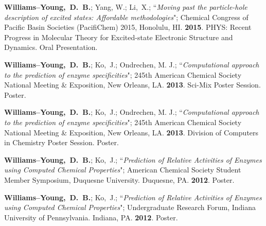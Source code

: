 \documentclass[10pt]{res} %
\newcommand*\me[0]{{\bf Williams--Young,~D.~B.}}
\newcommand*\xsli[0]{Li,~X.}
\newcommand*\ko[0]{Ko,~J.}
\begin{document}
\begin{resume}
\begin{etaremune}
  \item \me; Yang, W.; \xsli;
        ``\emph{Moving past the particle-hole description of excited states: Affordable methodologies}";
	Chemical Congress of Pacific Basin Societies (PacifiChem) 2015, Honolulu, HI.
	\textbf{2015}. 
	PHYS: Recent Progress in Molecular Theory for Excited-state Electronic Structure and
	Dynamics. Oral Presentation.
  \item \me; \ko; Ondrechen, M. J.;
	``\emph{Computational approach to the prediction of enzyme specificities}";
	245th American Chemical Society National Meeting \& Exposition, New Orleans, LA.
	\textbf{2013}. Sci-Mix Poster Session. Poster.
  \item \me; \ko; Ondrechen, M. J.;
	``\emph{Computational approach to the prediction of enzyme specificities}";
	245th American Chemical Society National Meeting \& Exposition, New Orleans, LA.
	\textbf{2013}. Division of Computers in Chemistry Poster Session. Poster.
  \item \me; \ko;
	``\emph{Prediction of Relative Activities of Enzymes using Computed Chemical Properties}";
	American Chemical Society Student Member Symposium, Duquesne University. Duquesne, PA.
	\textbf{2012}. Poster.
  \item \me; \ko;
	``\emph{Prediction of Relative Activities of Enzymes using Computed Chemical Properties}";
	Undergraduate Research Forum, Indiana University of Pennsylvania. Indiana, PA.
	\textbf{2012}. Poster.
\end{etaremune}

\vspace{0.2in} %


\end{resume}
\end{document}
